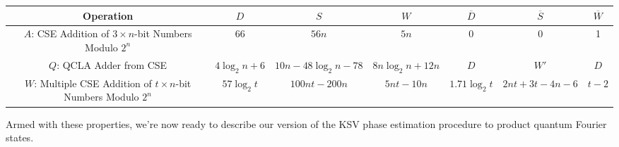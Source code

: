 \begin{table}[hbt!]
\begin{tabular}{|c|c|c|c|c|c|c|}
\hline
Operation & $D$ & $S$ & $W$ & $\overline{D}$ & $\overline{S}$ & $\overline{W}$ \\
\hline
$A$: CSE Addition of $3\times n$-bit Numbers Modulo $2^n$ & $66$ & $56n$ & $5n$ & 0 & 0 & 1 \\
$Q$: QCLA Adder from CSE & $4\log_2 n + 6$ & $10n - 48\log_2 n - 78$ & $8n \log_2 n + 12n$ & $D$ & $W'$ & $D$  \\
$W$: Multiple CSE Addition of $t\times n$-bit Numbers Modulo $2^n$ & $57\log_2 t$ & $100nt - 200n$ & $5nt - 10n$ & $1.71\log_2 t$ & $2nt + 3t - 4n - 6$ & $t-2$
\end{tabular}
\end{table}
Armed with these properties, we're now ready to describe our version of the
KSV phase estimation procedure to product quantum Fourier states.